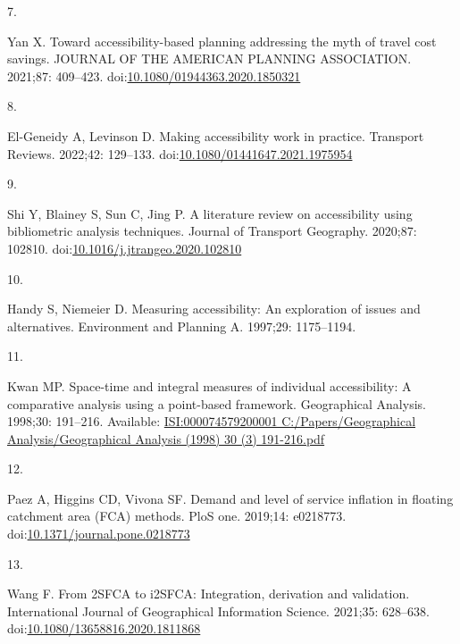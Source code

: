\documentclass[10pt,letterpaper]{article}
\newlength{\cslhangindent}
\newlength{\csllabelwidth}
\newlength{\cslentryspacingunit} %
\newenvironment{CSLReferences}[2] %
 {%
  \setlength{\parindent}{0pt}
  \ifodd #1
  \let\oldpar\par
  \def\par{\hangindent=\cslhangindent\oldpar}
  \fi
  \setlength{\parskip}{#2\cslentryspacingunit}
 }%
 {}
\newcommand{\CSLLeftMargin}[1]{\parbox[t]{\csllabelwidth}{#1}}
\newcommand{\CSLRightInline}[1]{\parbox[t]{\linewidth - \csllabelwidth}{#1}\break}
\begin{document}
\begin{CSLReferences}{0}{0}
\leavevmode{}%
\CSLLeftMargin{7. }%
\CSLRightInline{Yan X. Toward accessibility-based planning addressing
the myth of travel cost savings. {JOURNAL} {OF} {THE} {AMERICAN}
{PLANNING} {ASSOCIATION}. 2021;87: 409--423.
doi:\href{https://doi.org/10.1080/01944363.2020.1850321}{10.1080/01944363.2020.1850321}}

\leavevmode{}%
\CSLLeftMargin{8. }%
\CSLRightInline{El-Geneidy A, Levinson D. Making accessibility work in
practice. Transport Reviews. 2022;42: 129--133.
doi:\href{https://doi.org/10.1080/01441647.2021.1975954}{10.1080/01441647.2021.1975954}}

\leavevmode{}%
\CSLLeftMargin{9. }%
\CSLRightInline{Shi Y, Blainey S, Sun C, Jing P. A literature review on
accessibility using bibliometric analysis techniques. Journal of
Transport Geography. 2020;87: 102810.
doi:\href{https://doi.org/10.1016/j.jtrangeo.2020.102810}{10.1016/j.jtrangeo.2020.102810}}

\leavevmode{}%
\CSLLeftMargin{10. }%
\CSLRightInline{Handy S, Niemeier D. Measuring accessibility: An
exploration of issues and alternatives. Environment and Planning A.
1997;29: 1175--1194. }

\leavevmode{}%
\CSLLeftMargin{11. }%
\CSLRightInline{Kwan MP. Space-time and integral measures of individual
accessibility: A comparative analysis using a point-based framework.
Geographical Analysis. 1998;30: 191--216. Available:
\href{https://ISI:000074579200001\%0AC:/Papers/Geographical\%20Analysis/Geographical\%20Analysis\%20(1998)\%2030\%20(3)\%20191-216.pdf}{ISI:000074579200001
C:/Papers/Geographical Analysis/Geographical Analysis (1998) 30 (3)
191-216.pdf}}

\leavevmode{}%
\CSLLeftMargin{12. }%
\CSLRightInline{Paez A, Higgins CD, Vivona SF. Demand and level of
service inflation in floating catchment area (FCA) methods. PloS one.
2019;14: e0218773.
doi:\href{https://doi.org/10.1371/journal.pone.0218773}{10.1371/journal.pone.0218773}}

\leavevmode{}%
\CSLLeftMargin{13. }%
\CSLRightInline{Wang F. From 2SFCA to i2SFCA: Integration, derivation
and validation. International Journal of Geographical Information
Science. 2021;35: 628--638.
doi:\href{https://doi.org/10.1080/13658816.2020.1811868}{10.1080/13658816.2020.1811868}}


\end{CSLReferences}
\end{document}
